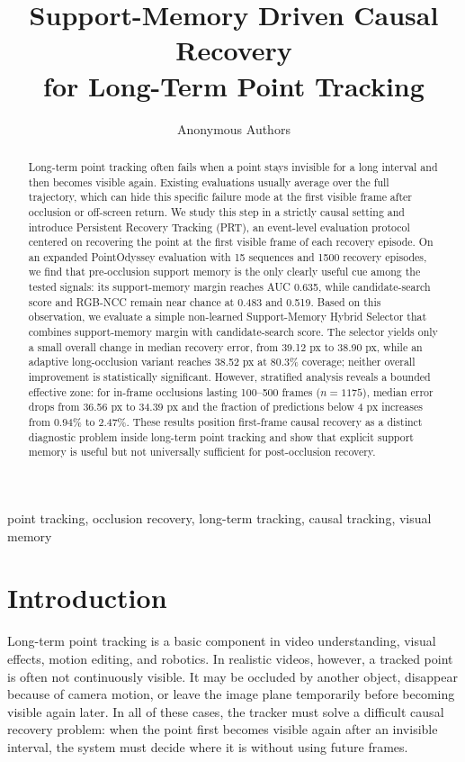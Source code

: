 \documentclass[10pt,journal,compsoc]{IEEEtran}
\title{Support-Memory Driven Causal Recovery\\ for Long-Term Point Tracking}
\author{Anonymous Authors}
\begin{document}
\maketitle

\begin{abstract}
Long-term point tracking often fails when a point stays invisible for a long interval and then becomes visible again. Existing evaluations usually average over the full trajectory, which can hide this specific failure mode at the first visible frame after occlusion or off-screen return. We study this step in a strictly causal setting and introduce Persistent Recovery Tracking (PRT), an event-level evaluation protocol centered on recovering the point at the first visible frame of each recovery episode. On an expanded PointOdyssey evaluation with 15 sequences and 1500 recovery episodes, we find that pre-occlusion support memory is the only clearly useful cue among the tested signals: its support-memory margin reaches AUC 0.635, while candidate-search score and RGB-NCC remain near chance at 0.483 and 0.519. Based on this observation, we evaluate a simple non-learned Support-Memory Hybrid Selector that combines support-memory margin with candidate-search score. The selector yields only a small overall change in median recovery error, from 39.12 px to 38.90 px, while an adaptive long-occlusion variant reaches 38.52 px at 80.3\% coverage; neither overall improvement is statistically significant. However, stratified analysis reveals a bounded effective zone: for in-frame occlusions lasting 100--500 frames ($n=1175$), median error drops from 36.56 px to 34.39 px and the fraction of predictions below 4 px increases from 0.94\% to 2.47\%. These results position first-frame causal recovery as a distinct diagnostic problem inside long-term point tracking and show that explicit support memory is useful but not universally sufficient for post-occlusion recovery.
\end{abstract}

\begin{IEEEkeywords}
point tracking, occlusion recovery, long-term tracking, causal tracking, visual memory
\end{IEEEkeywords}

\section{Introduction}
\label{sec:intro}

Long-term point tracking is a basic component in video understanding, visual effects, motion editing, and robotics. In realistic videos, however, a tracked point is often not continuously visible. It may be occluded by another object, disappear because of camera motion, or leave the image plane temporarily before becoming visible again later. In all of these cases, the tracker must solve a difficult causal recovery problem: when the point first becomes visible again after an invisible interval, the system must decide where it is without using future frames.
\end{document}
